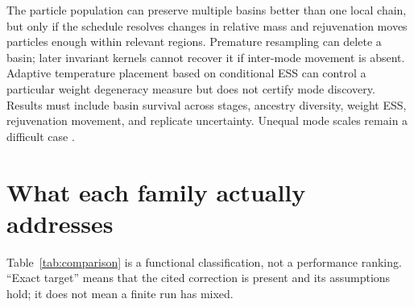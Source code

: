 \documentclass[11pt]{article}
\begin{document}
The particle population can preserve multiple basins better than one local chain,
but only if the schedule resolves changes in relative mass and rejuvenation moves
particles enough within relevant regions.  Premature resampling can delete a basin;
later invariant kernels cannot recover it if inter-mode movement is absent.  Adaptive
temperature placement based on conditional ESS can control a particular weight
degeneracy measure but does not certify mode discovery.  Results must include basin
survival across stages, ancestry diversity, weight ESS, rejuvenation movement, and
replicate uncertainty.  Unequal mode scales remain a difficult case
\citep{park2025athmc}.

\section{What each family actually addresses}

Table~\ref{tab:comparison} is a functional classification, not a performance ranking.
``Exact target'' means that the cited correction is present and its assumptions hold;
it does not mean a finite run has mixed.
\end{document}
